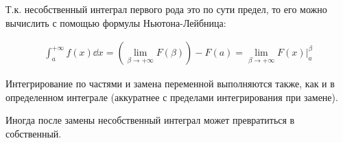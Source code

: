 
Т.к. несобственный интеграл первого рода это по сути предел, то его можно
вычислить с помощью формулы Ньютона-Лейбница:

\begin{align*}
  \int_{a}^{+\infty} f(x) \dd x
  = \left( \lim_{\beta \to +\infty} F(\beta) \right) - F(a)
  = \lim_{\beta \to +\infty} F(x) \bigg\vert_{a}^{\beta}
\end{align*}

Интегрирование по частями и замена переменной выполняются также, как и в
определенном интеграле (аккуратнее с пределами интегрирования при замене).

\begin{remark}
  Иногда после замены несобственный интеграл может превратиться в собственный.
\end{remark}
